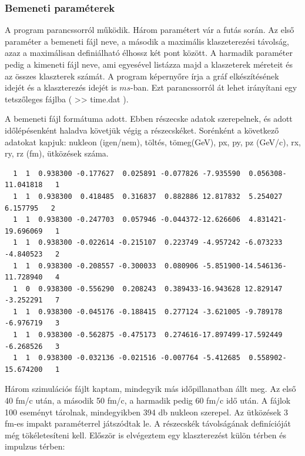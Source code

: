 \documentclass[a4paper,12pt]{article}
\begin{document}
\subsubsection{ Bemeneti paraméterek}
\par A program parancssorról működik.  Három paramétert vár a futás során. Az első paraméter a bemeneti fájl neve, a második a maximális 
klaszeterezési távolság, azaz a maximálisan definiálható élhossz két pont között. A harmadik paraméter pedig a kimeneti fájl neve, ami
egyesével listázza majd a klaszeterek méreteit és az összes klaszterek számát. A program képernyőre írja a gráf elkészítésének idejét
és a klaszterezés idejét is $ms$-ban. Ezt parancssorról át lehet irányítani egy tetszőleges fájlba ( >> time.dat ).
\par A bemeneti fájl formátuma adott. Ebben részecske adatok szerepelnek, és adott időlépésenként haladva követjük végig a részecskéket.
Sorénként a következő adatokat kapjuk: nukleon (igen/nem), töltés, tömeg(GeV), px, py, pz (GeV/c), rx, ry, rz (fm), ütközések száma.
\begin{lstlisting}
  1  1  0.938300 -0.177627  0.025891 -0.077826 -7.935590  0.056308-11.041818   1
  1  1  0.938300  0.418485  0.316837  0.882886 12.817832  5.254027  6.157795   2
  1  1  0.938300 -0.247703  0.057946 -0.044372-12.626606  4.831421-19.696069   1
  1  1  0.938300 -0.022614 -0.215107  0.223749 -4.957242 -6.073233 -4.840523   2
  1  1  0.938300 -0.208557 -0.300033  0.080906 -5.851900-14.546136-11.728940   4
  1  0  0.938300 -0.556290  0.208243  0.389433-16.943628 12.829147 -3.252291   7
  1  1  0.938300 -0.045176 -0.188415  0.277124 -3.621005 -9.789178 -6.976719   3
  1  1  0.938300 -0.562875 -0.475173  0.274616-17.897499-17.592449 -6.268526   3
  1  1  0.938300 -0.032136 -0.021516 -0.007764 -5.412685  0.558902-15.674200   1
\end{lstlisting}
\par Három szimulációs fájlt kaptam, mindegyik más időpillanatban állt meg. Az első 40 fm/c után, a második 50 fm/c, a harmadik pedig 60 fm/c
idő után. A fájlok 100 eseményt tárolnak, mindegyikben 394 db nukleon szerepel. Az ütközések 3 fm-es impakt paraméterrel játszódtak le. A részecskék
távolságának definícióját még tökéletesíteni kell. Először is elvégeztem egy klaszterezést külön térben és impulzus térben:
\end{document}

